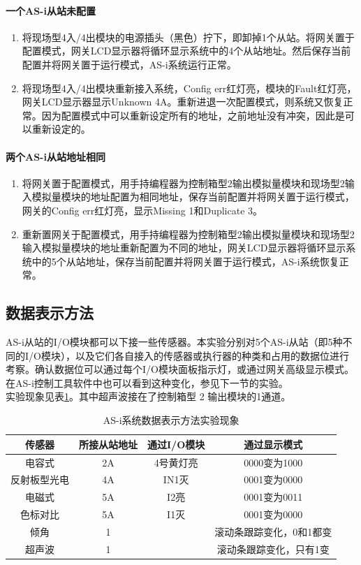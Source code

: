 \paragraph{一个AS-i从站未配置}
\begin{enumerate}
\item 将现场型4入/4出模块的电源插头（黑色）拧下，即卸掉1个从站。将网关置于配置模式，网关LCD显示器将循环显示系统中的4个从站地址。然后保存当前配置并将网关置于运行模式，AS-i系统运行正常。
\item 将现场型4入/4出模块重新接入系统，Config err红灯亮，模块的{\ttfamily Fault}红灯亮，网关LCD显示器显示{\ttfamily Unknown 4A}。重新进退一次配置模式，则系统又恢复正常。因为配置模式中可以重新设定所有的地址，之前地址没有冲突，因此是可以重新设定的。
\end{enumerate}
\paragraph{两个AS-i从站地址相同}
\begin{enumerate}
\item 将网关置于配置模式，用手持编程器为控制箱型2输出模拟量模块和现场型2输入模拟量模块的地址配置为相同地址，保存当前配置并将网关置于运行模式，网关的Config err红灯亮，显示{\ttfamily Missing 1}和{\ttfamily Duplicate 3}。
\item 重新置网关于配置模式，用手持编程器为控制箱型2输出模拟量模块和现场型2输入模拟量模块的地址重新配置为不同的地址，网关LCD显示器将循环显示系统中的5个从站地址，保存当前配置并将网关置于运行模式，AS-i系统恢复正常。
\end{enumerate}

\subsection{数据表示方法}
AS-i从站的I/O模块都可以下接一些传感器。本实验分别对5个AS-i从站（即5种不同的I/O模块），以及它们各自接入的传感器或执行器的种类和占用的数据位进行考察。确认数据位可以通过每个I/O模块面板指示灯，或通过网关高级显示模式。在AS-i控制工具软件中也可以看到这种变化，参见下一节的实验。\\
实验现象见表\ref{tab:dr}。其中超声波接在了控制箱型 2 输出模块的1通道。
\begin{table}[htbp]
\centering
\begin{tabular}{|c|c|c|c|}
	\hline
	传感器 & 所接从站地址 & 通过I/O模块 & 通过显示模式 \\
	\hline
	电容式 & 2A & 4号黄灯亮 & 0000变为1000 \\
	反射板型光电 & 4A & IN1灭 & 0001变为0000 \\
	电磁式 & 5A & I2亮 & 0001变为0011 \\
	色标对比 & 5A & I1灭 & 0001变为0000 \\
	倾角 & 1 & & 滚动条跟踪变化，0和1都变\\
	超声波 & 1 & & 滚动条跟踪变化，只有1变 \\
	\hline
\end{tabular}
\caption{AS-i系统数据表示方法实验现象}
\label{tab:dr}
\end{table}

